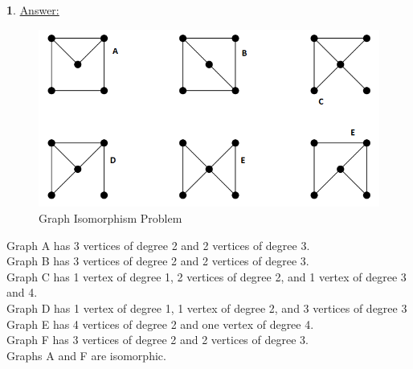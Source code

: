 \documentclass[12pt,a4paper]{article}
\theoremstyle{definition}
\newtheorem{problem}{}
\begin{document}
\begin{problem}
\underline{Answer:} \\
\begin{figure}[H]
    \centering
    \includegraphics[scale=0.6]{q6.png}
    \caption{Graph Isomorphism Problem}
    \label{fig:my_label}
\end{figure}

Graph A has 3 vertices of degree 2 and 2 vertices of degree 3. \\
Graph B has 3 vertices of degree 2 and 2 vertices of degree 3. \\
Graph C has 1 vertex of degree 1, 2 vertices of degree 2, and 1 vertex of degree 3 and 4. \\
Graph D has 1 vertex of degree 1, 1 vertex of degree 2, and 3 vertices of degree 3\\
Graph E has 4 vertices of degree 2 and one vertex of degree 4. \\
Graph F has 3 vertices of degree 2 and 2 vertices of degree 3. \\

Graphs A and F are isomorphic.

\end{problem}
\end{document}
